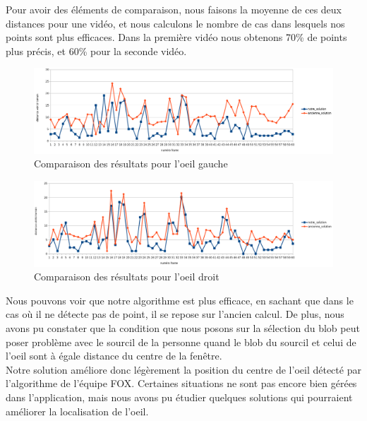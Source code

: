 Pour avoir des éléments de comparaison, nous faisons la moyenne de ces deux distances pour une vidéo, et nous calculons
le nombre de cas dans lesquels nos points sont plus efficaces. Dans la première vidéo nous obtenons 70\% de points plus précis, et
60\% pour la seconde vidéo.\\

\begin{figure}[H]
  \includegraphics[width=17cm]{resultat/resultat_gauche.png}
  \caption{Comparaison des résultats pour l'oeil gauche}
\end{figure}

\begin{figure}[H]
  \includegraphics[width=17cm]{resultat/resultat_droit.png}
  \caption{Comparaison des résultats pour l'oeil droit}
\end{figure}

Nous pouvons voir que notre algorithme est plus efficace, en sachant que dans le cas où il ne détecte pas de point, il se repose sur l'ancien
calcul. De plus, nous avons pu constater que la condition que nous posons sur la sélection du blob peut poser problème 
avec le sourcil de la personne quand le blob du sourcil et celui de l'oeil sont à égale distance du centre de la fenêtre.\\

Notre solution améliore donc légèrement la position du centre de l'oeil détecté par l'algorithme de l'équipe FOX. Certaines
situations ne sont pas encore bien gérées dans l'application, mais nous avons pu étudier quelques solutions qui pourraient améliorer
la localisation de l'oeil.

